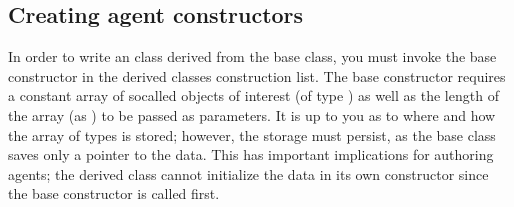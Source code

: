\documentclass[letterpaper,12pt,english,openany,oneside]{sphinxmanual}
\begin{document}
\begin{sphinxVerbatim}[commandchars=\\\{\}]
    

  
    
   \PYG{p}{[} \PYG{p}{]}
   


   
    
 


  
     
     
  
  
\end{sphinxVerbatim}


\subsection{Creating agent constructors}
\label{\detokenize{Plugins_ExtendedAPI:creating-agent-constructors}}
In order to write an  class derived from the  base class, you must invoke the base constructor in the derived classes construction list. The base constructor requires a constant array of so\sphinxhyphen{}called objects of interest (of type  ) as well as the length of the array (as  ) to be passed as parameters. It is up to you as to where and how the array of types is stored; however, the storage must persist, as the base class saves only a pointer to the data. This has important implications for authoring agents; the derived class cannot initialize the data in its own constructor since the base constructor is called first.
\end{document}
